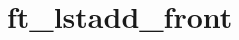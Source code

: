 \chapter{ft\+\_\+lstadd\+\_\+front}
\hypertarget{md_Documentation_2ft__lstadd__front}{}\label{md_Documentation_2ft__lstadd__front}
